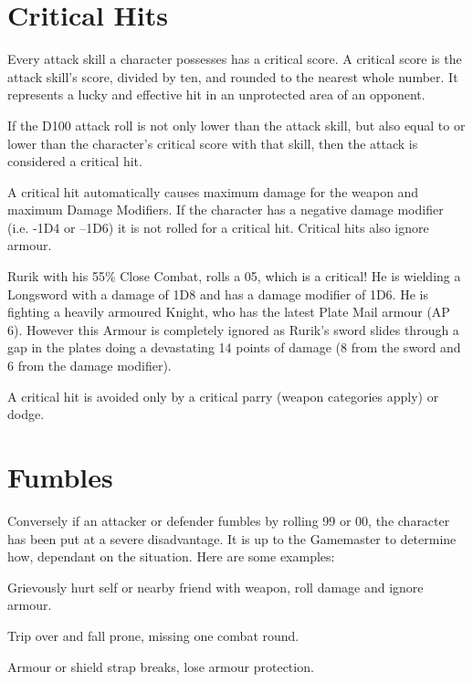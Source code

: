 \section{Critical Hits}
Every attack skill a character possesses has a critical score. A critical score is the attack skill’s score, divided by ten, and rounded to the nearest whole number. It represents a lucky and effective hit in an unprotected area of an opponent.

If the D100 attack roll is not only lower than the attack skill, but also equal to or lower than the character’s critical score with that skill, then the attack is considered a critical hit. 

A critical hit automatically causes maximum damage for the weapon and maximum Damage Modifiers. If the character has a negative damage modifier (i.e. -1D4 or –1D6) it is not rolled for a critical hit. Critical hits also ignore armour.

\begin{rpg-examplebox}
 Rurik with his 55\% Close Combat, rolls a 05, which is a critical! He is wielding a Longsword with a damage of 1D8 and has a damage modifier of 1D6. He is fighting a heavily armoured Knight, who has the latest Plate Mail armour (AP 6). However this Armour is completely ignored as Rurik’s sword slides through a gap in the plates doing a devastating 14 points of damage (8 from the sword and 6 from the damage modifier).
\end{rpg-examplebox}

A critical hit is avoided only by a critical parry (weapon categories apply) or dodge.



\section{Fumbles}
Conversely if an attacker or defender fumbles by rolling 99 or 00, the character has been put at a severe disadvantage. It is up to the Gamemaster to determine how, dependant on the situation. Here are some examples:
\begin{rpg-list}
	\item Grievously hurt self or nearby friend with weapon, roll damage and ignore armour.
	\item Trip over and fall prone, missing one combat round.
	\item Armour or shield strap breaks, lose armour protection.
\end{rpg-list}



